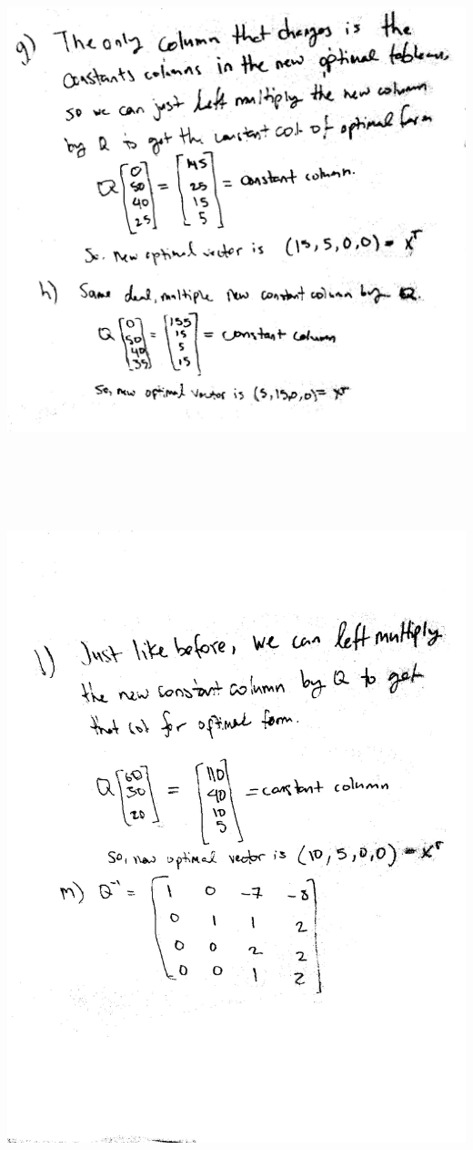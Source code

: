 \documentclass[a4paper,12pt]{article}
\begin{document}
\begin{center}
\includegraphics[width=7in, height=7in, keepaspectratio=true]{image/sixthree2.jpg}\\
\includegraphics[width=7in, height=7in, keepaspectratio=true]{image/sixthree3.jpg}
\end{center}
\end{document}
